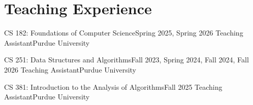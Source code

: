 \section{Teaching Experience}

\begin{resumeEntries}
  \resumeEntry
    {CS 182: Foundations of Computer Science}{Spring 2025, Spring 2026}
    {Teaching Assistant}{Purdue University}

  \resumeEntry
    {CS 251: Data Structures and Algorithms}{Fall 2023, Spring 2024, Fall 2024, Fall 2026}
    {Teaching Assistant}{Purdue University}

  \resumeEntry
    {CS 381: Introduction to the Analysis of Algorithms}{Fall 2025}
    {Teaching Assistant}{Purdue University}
\end{resumeEntries}

